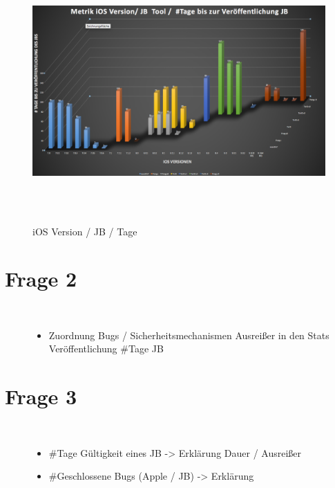 \begin{figure}[htbp]
        \centering
                \includegraphics[height=10cm]{Bilder/Frage1_2.png}
        \caption{iOS Version / JB / Tage}
        \label{fig:AnalyseiOSJB2}
\end{figure}

\section{Frage 2}
\label{sec:Frage2}

\begin{description}
    \item[\parbox{\textwidth} {Antwort kurz INFO Katharina}]~\par
        \begin{itemize}
                \item Zuordnung Bugs / Sicherheitsmechanismen Ausreißer in den Stats Veröffentlichung \#Tage JB  
        \end{itemize}
\end{description} 
        


\section{Frage 3}
\label{sec:Frage3}

\begin{description}
    \item[\parbox{\textwidth} {Antwort kurz INFO Katharina}]~\par
        \begin{itemize}
                \item \#Tage Gültigkeit eines JB -> Erklärung Dauer / Ausreißer
                \item \#Geschlossene Bugs (Apple / JB)   -> Erklärung 
        \end{itemize}
\end{description} 
 